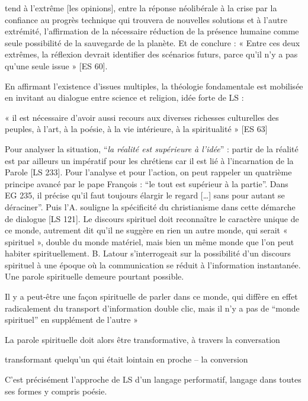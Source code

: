 \begin{singlequote}
 [l'encyclique] tend à l’extrême [les opinions], entre la réponse néolibérale à la crise par la confiance au progrès technique qui trouvera de nouvelles solutions et à l’autre extrémité, l’affirmation de la nécessaire réduction de la présence humaine comme seule possibilité de la sauvegarde de la planète. Et de conclure : « Entre ces deux extrêmes, la réflexion devrait identifier des scénarios futurs, parce qu’il n’y a pas qu’une seule issue » [ES 60]. \cite[par. 5]{goujon_laudato_2022}
 \end{singlequote}
 En affirmant l’existence d’issues multiples, la théologie fondamentale est mobilisée en invitant au dialogue entre science et religion, idée forte de LS :
 \begin{singlequote}
« il est nécessaire d’avoir aussi recours aux diverses richesses culturelles des peuples, à l’art, à la poésie, à la vie intérieure, à la spiritualité » [ES 63]
\end{singlequote}


Pour analyser la situation, “\textit{la réalité est supérieure à l’idée}” : partir de la réalité est par ailleurs un impératif pour les chrétiens car il est lié à l'incarnation de la Parole  [LS 233]. Pour l’analyse et pour l’action, on peut rappeler un quatrième principe avancé par le pape François : “le tout est supérieur à la partie”. Dans EG 235, il précise qu’il faut toujours élargir le regard […] sans pour autant se déraciner”.  
Puis l'A. souligne la spécificité du christianisme dans cette démarche de dialogue [LS 121]. Le discours spirituel doit reconnaître le caractère unique de ce monde, autrement dit qu’il ne suggère en rien un autre monde, qui serait « spirituel », double du monde matériel, mais bien un même monde que l’on peut habiter spirituellement. B. Latour \cite{latour_jubiler_2002} s'interrogeait sur la possibilité d'un discours spirituel à une époque où la communication se réduit à l'information instantanée. Une parole spirituelle demeure pourtant possible.

\begin{singlequote}
Il y a peut-être une façon spirituelle de parler dans ce monde, qui diffère en effet radicalement du transport d’information double clic, mais il n’y a pas de “monde spirituel” en supplément de l’autre »\cite[p.40]{latour_jubiler_2002}
\end{singlequote}
La parole spirituelle doit alors être transformative, à travers la conversation
\begin{singlequote}
transformant quelqu’un qui était lointain en proche – la conversion \cite[p.45]{latour_jubiler_2002}
\end{singlequote}
C'est précisément l'approche de LS d'un langage performatif, langage dans toutes ses formes y compris poésie.
 
